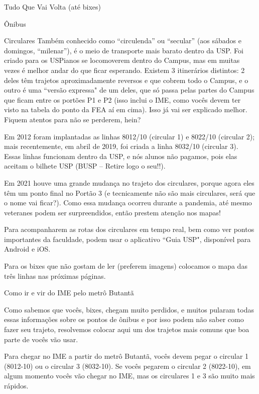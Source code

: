 \begin{secao}{Tudo Que Vai Volta (até bixes)}
\begin{subsecao}{Ônibus}
\begin{subsubsecao}{Circulares}
Também conhecido como ``circulenda'' ou ``secular'' (aos sábados e domingos,
``milenar''), é o meio de transporte mais barato dentro da USP. Foi criado para
os USPianos se locomoverem dentro do Campus, mas em muitas vezes é melhor andar
do que ficar esperando. Existem 3 itinerários distintos: 2 deles têm trajetos
aproximadamente reversos e que cobrem todo o Campus, e o outro é uma
``versão expressa" de um deles, que só passa pelas partes do Campus que ficam
entre os portões P1 e P2 (isso inclui o IME, como vocês devem ter visto na
tabela do ponto da FEA aí em cima). Isso já vai ser explicado melhor. Fiquem
atentos para não se perderem, hein?

Em 2012 foram implantadas as linhas 8012/10 (circular 1) e 8022/10 (circular 2);
mais recentemente, em abril de 2019, foi criada a linha 8032/10 (circular 3).
Essas linhas funcionam dentro da USP, e nós alunos não pagamos, pois elas
aceitam o bilhete USP (BUSP -- Retire logo o seu!!).

Em 2021 houve uma grande mudança no trajeto dos circulares, porque agora eles
têm um ponto final no Portão 3 (e tecnicamente não são mais circulares, será que
o nome vai ficar?). Como essa mudança ocorreu durante a pandemia, até mesmo
veteranes podem ser surpreendidos, então prestem atenção nos mapas!

Para acompanharem as rotas dos circulares em tempo real, bem como ver pontos
importantes da faculdade, podem usar o aplicativo ``Guia USP", disponível para
Android e iOS.

Para os bixes que não gostam de ler (preferem imagens) colocamos o
mapa das três linhas nas próximas páginas.


\end{subsubsecao}

\begin{subsubsecao}{Como ir e vir do IME pelo metrô Butantã}

Como sabemos que vocês, bixes, chegam muito perdidos, e muitos pularam todas
essas informações sobre os pontos de ônibus e por isso podem não saber como
fazer seu trajeto, resolvemos colocar aqui um dos trajetos mais comuns que boa
parte de vocês vão usar.

Para chegar no IME a partir do metrô Butantã, vocês devem pegar o circular 1
(8012-10) ou o circular 3 (8032-10). Se vocês pegarem o circular 2 (8022-10),
em algum momento vocês vão chegar no IME, mas os circulares 1 e 3 são muito mais
rápidos.


\end{subsubsecao}
\end{subsecao}
\end{secao}
